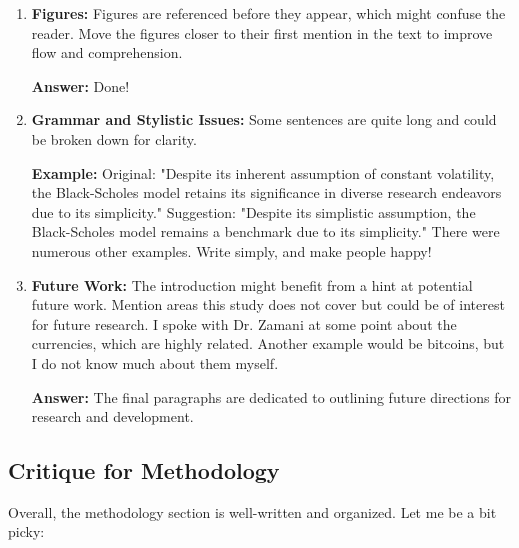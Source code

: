 \begin{enumerate}
\textbf{Answer:}
The introduction has been refined to enhance clarity, including adding a figure depicting the hierarchy of studies and their relevance to our research.

\item \textbf{Figures:}
Figures are referenced before they appear, which might confuse the reader. Move the figures closer to their first mention in the text to improve flow and comprehension.

\textbf{Answer:}
Done!

\item \textbf{Grammar and Stylistic Issues:}
Some sentences are quite long and could be broken down for clarity.

\textbf{Example:}
Original: "Despite its inherent assumption of constant volatility, the Black-Scholes model retains its significance in diverse research endeavors due to its simplicity."
Suggestion: "Despite its simplistic assumption, the Black-Scholes model remains a benchmark due to its simplicity." There were numerous other examples. Write simply, and make people happy!

\item \textbf{Future Work:}
The introduction might benefit from a hint at potential future work. Mention areas this study does not cover but could be of interest for future research. I spoke with Dr. Zamani at some point about the currencies, which are highly related. Another example would be bitcoins, but I do not know much about them myself. 

\textbf{Answer:}
The final paragraphs are dedicated to outlining future directions for research and development.

\end{enumerate}


\subsection{Critique for Methodology}

Overall, the methodology section is well-written and organized. Let me be a bit picky:

